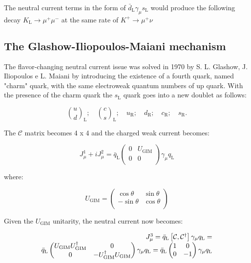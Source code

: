 The neutral current terms in the form of $\bar{d}_{\text{L}}\gamma_{\mu}s_{\text{L}}$ would produce the following decay $K_{\text{L}} \longrightarrow \mu^{+}\mu^{-}$ at the same rate of $K^{+} \longrightarrow \mu^{+}\nu$

\subsection{The Glashow-Iliopoulos-Maiani mechanism}

The flavor-changing neutral current issue was solved in 1970 by S. L. Glashow, J. Iliopoulos e L. Maiani \cite{Glashow:1970gm} by introducing the existence of a fourth quark, named "charm" quark, with the same electroweak quantum numbers of up quark. With the presence of the charm quark the $s_{\text{L}}$ quark goes into a new doublet as follows: 

\begin{equation}
\binom{u}{d}_{\text{L}}; \quad \binom{c}{s}_{\text{L}}; \quad u_{\text{R}}; \quad d_{\text{R}}; \quad c_{\text{R}}; \quad s_{\text{R}}.
\end{equation}

The $\mathcal{C}$ matrix becomes 4 x 4 and the charged weak current becomes:

\begin{equation}
J^{1}_{\mu} + i J^{2}_{\mu} = \bar{q}_{\text{L}} 
\begin{pmatrix}
0 &U_{\text{GIM}} \\
0 &0 \\
\end{pmatrix}
\gamma_{\mu}q_{\text{L}}
\label{eq::cab_current_gim}
\end{equation}

where:

\begin{equation}
U_{\text{GIM}} =
\begin{pmatrix}
\cos\theta &\sin\theta \\
-\sin\theta &\cos\theta \\
\end{pmatrix}
\end{equation}

Given the $U_{\text{GIM}}$ unitarity, the neutral current now becomes:

\begin{equation}
	\begin{array}{r c l}
		J^{3}_{\mu} = \bar{q}_{\text{L}}\left[\mathcal{C}, \mathcal{C}^{\dagger} \right]\gamma_{\mu}q_{\text{L}} = \\
		\bar{q}_{\text{L}}
		\begin{pmatrix}
			U_{\text{GIM}}U_{\text{GIM}}^{\dagger} &0 \\
			0 &-U_{\text{GIM}}^{\dagger}U_{\text{GIM}} \\
		\end{pmatrix}
		\gamma_{\mu}q_{\text{L}} = \bar{q}_{\text{L}}
		\begin{pmatrix}
			1 &0 \\
			0 &-1 \\
		\end{pmatrix}
		\gamma_{\mu}q_{\text{L}}
	\end{array}
\end{equation}

